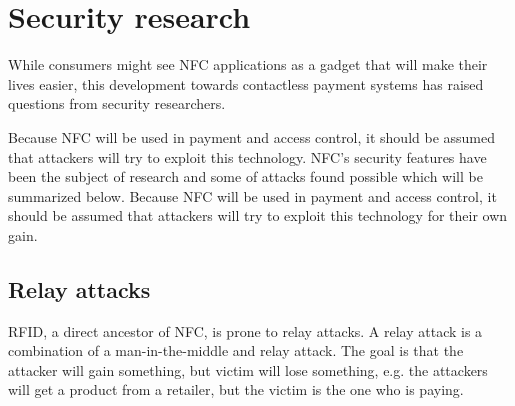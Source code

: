 \section{Security research}

While consumers might see NFC applications as a gadget that will make their lives easier, this development towards contactless payment systems has raised questions from security researchers.

Because NFC will be used in payment and access control, it should be assumed that attackers will try to exploit this technology.
NFC's security features have been the subject of research and some of attacks found possible which will be summarized below.
Because NFC will be used in payment and access control, it should be assumed that attackers will try to exploit this technology for their own gain. 


\subsection{Relay attacks}
RFID, a direct ancestor of NFC, is prone to relay attacks.
A relay attack is a combination of a man-in-the-middle and relay attack.
The goal is that the attacker will gain something, but victim will lose something, e.g. the attackers will get a product from a retailer, but the victim is the one who is paying. 


